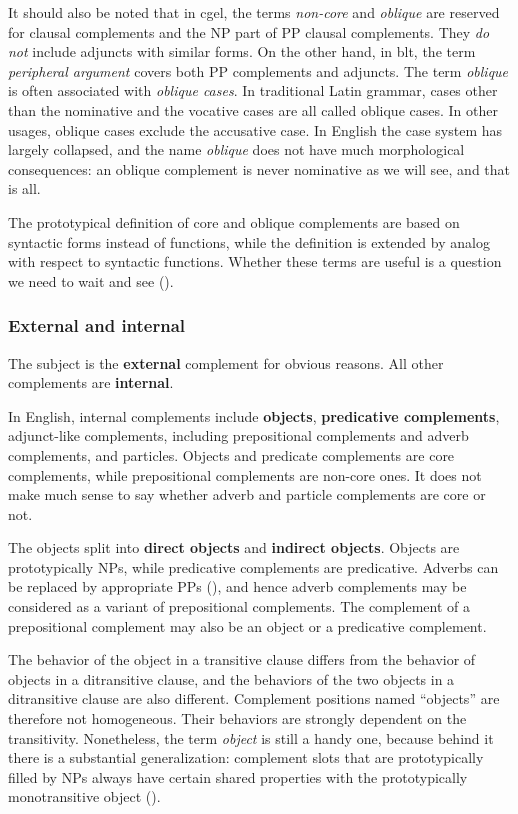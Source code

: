 \documentclass{article}
\newcommand*{\concept}[1]{\textbf{#1}}
\newcommand*{\term}[1]{\emph{#1}}
\begin{document}
It should also be noted that in \ac{cgel}, the terms \term{non-core} and \term{oblique} 
are reserved for clausal complements and the NP part of PP clausal complements.
They \emph{do not} include adjuncts with similar forms.
On the other hand, in \ac{blt}, the term \term{peripheral argument} covers both PP complements and adjuncts.
The term \term{oblique} is often associated with \term{oblique cases}.
In traditional Latin grammar, 
cases other than the nominative and the vocative cases are all called oblique cases.
In other usages, oblique cases exclude the accusative case.
In English the case system has largely collapsed,
and the name \term{oblique} does not have much morphological consequences:
an oblique complement is never nominative as we will see, and that is all.

The prototypical definition of core and oblique complements 
are based on syntactic forms instead of functions,
while the definition is extended by analog with respect to syntactic functions.
Whether these terms are useful is a question we need to wait and see ().

\subsubsection{External and internal}\label{sec:external-and-internal}

The subject is the \concept{external} complement for obvious reasons.
All other complements are \concept{internal}.

In English, internal complements include \concept{objects}, \concept{predicative complements},
adjunct-like complements, including prepositional complements and adverb complements,
and particles.
Objects and predicate complements are core complements,
while prepositional complements are non-core ones.
It does not make much sense to say whether adverb and particle complements are core or not.

The objects split into \concept{direct objects} and \concept{indirect objects}.
Objects are prototypically NPs, 
while predicative complements are predicative.
Adverbs can be replaced by appropriate PPs (), %
and hence adverb complements may be considered as a variant of prepositional complements.
The complement of a prepositional complement may also be an object or a predicative complement.

The behavior of the object in a transitive clause differs from 
the behavior of objects in a ditransitive clause,
and the behaviors of the two objects in a ditransitive clause are also different.
Complement positions named ``objects'' are therefore not homogeneous.
Their behaviors are strongly dependent on the transitivity.
Nonetheless, the term \term{object} is still a handy one,
because behind it there is a substantial generalization:
complement slots that are prototypically filled by NPs 
always have certain shared properties with the prototypically monotransitive object
().
\end{document}
